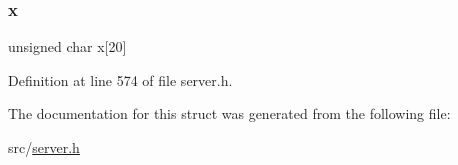 \subsubsection{\texorpdfstring{x}{x}}
{\footnotesize\ttfamily unsigned char x\mbox{[}20\mbox{]}}



Definition at line 574 of file server.\+h.



The documentation for this struct was generated from the following file\+:\begin{DoxyCompactItemize}
\item 
src/\hyperlink{server_8h}{server.\+h}\end{DoxyCompactItemize}
